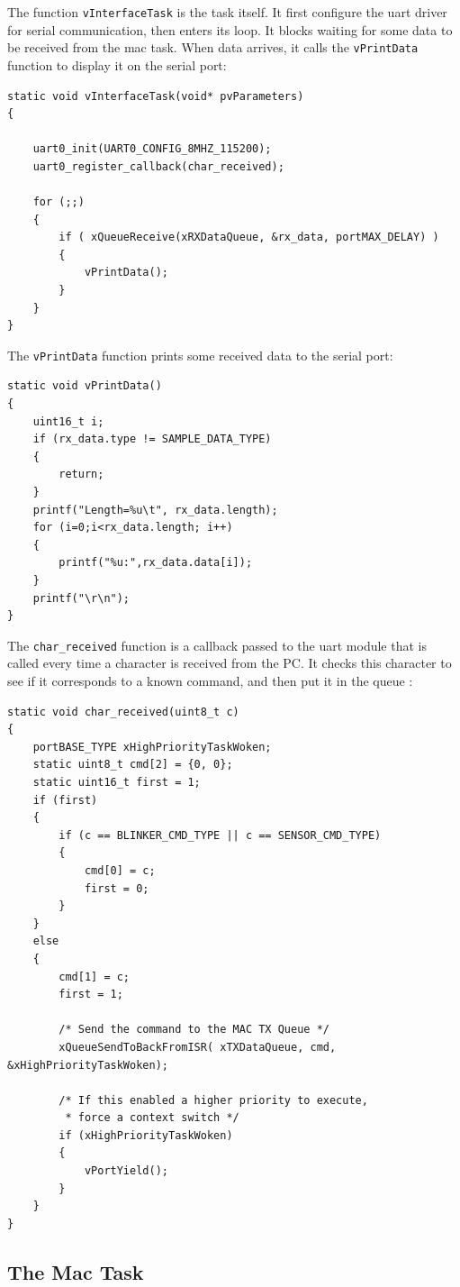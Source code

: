 \documentclass[11pt]{report}
\begin{document}
The function \verb$vInterfaceTask$ is the task itself. It first configure the uart driver for serial communication, then enters its loop. It blocks waiting for some data to be received from the mac task. When data arrives, it calls the \verb$vPrintData$ function to display it on the serial port:

\begin{verbatim}
static void vInterfaceTask(void* pvParameters)
{
    
    uart0_init(UART0_CONFIG_8MHZ_115200);
    uart0_register_callback(char_received);
    
    for (;;)
    {
        if ( xQueueReceive(xRXDataQueue, &rx_data, portMAX_DELAY) )
        {
            vPrintData();
        }
    }
}
\end{verbatim}
The \verb$vPrintData$ function prints some received data to the serial port:
\begin{verbatim}
static void vPrintData()
{
    uint16_t i;
    if (rx_data.type != SAMPLE_DATA_TYPE)
    {
        return;
    }
    printf("Length=%u\t", rx_data.length);
    for (i=0;i<rx_data.length; i++)
    {
        printf("%u:",rx_data.data[i]);
    }
    printf("\r\n");
}
\end{verbatim}


The \verb$char_received$ function is a callback passed to the uart module that is called every time a character is received from the PC. It checks this character to see if it corresponds to a known command, and then put it in the queue :
\begin{verbatim}
static void char_received(uint8_t c)
{
    portBASE_TYPE xHighPriorityTaskWoken;
    static uint8_t cmd[2] = {0, 0};
    static uint16_t first = 1;
    if (first)
    {
        if (c == BLINKER_CMD_TYPE || c == SENSOR_CMD_TYPE)
        {
            cmd[0] = c;
            first = 0;
        }
    }
    else
    {
        cmd[1] = c;
        first = 1;
        
        /* Send the command to the MAC TX Queue */
        xQueueSendToBackFromISR( xTXDataQueue, cmd, &xHighPriorityTaskWoken);
        
        /* If this enabled a higher priority to execute,
         * force a context switch */
        if (xHighPriorityTaskWoken)
        {
            vPortYield();
        }
    }
}
\end{verbatim}

\subsection{The Mac Task}
\end{document}
